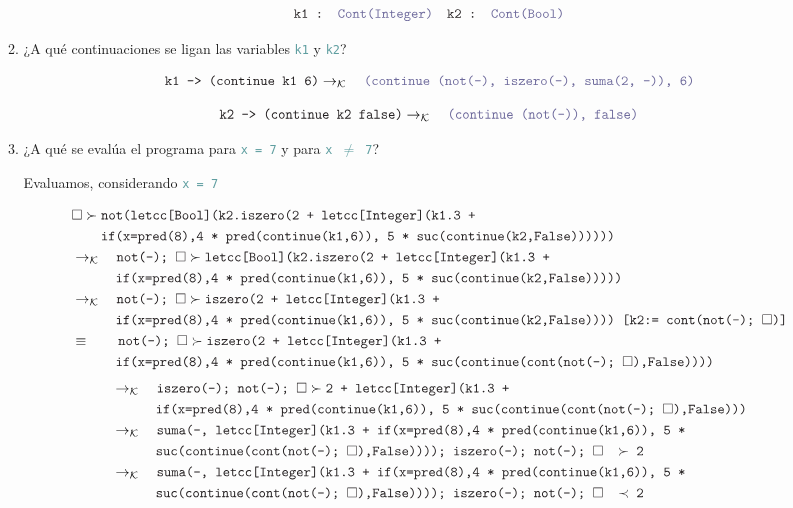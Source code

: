 \documentclass{article}
\newcommand{\tx}[1]{\textcolor{Black} {\texttt{#1}}}
\newcommand{\tp}[1]{\textcolor{CadetBlue} {\texttt{#1}}}
\newcommand{\es}{$\square$}
\newcommand{\pop}[2]{ \tx{#1} \succ \tx{#2}}
\newcommand{\kr}{\rightarrow_{\mathcal{K}} \quad}
\begin{document}
\begin{enumerate}
\begin{enumerate}
            \[
                \tx{k1 : } \tp{Cont(Integer)} \quad \tx{k2 : } \tp{Cont(Bool)}
            \]

            \item ¿A qué continuaciones se ligan las variables \tp{k1} y \tp{k2}?

			\[
			\tx{k1 --> (continue k1 6)} 
			\kr \tp{(continue (not(-), iszero(-), suma(2, -)), 6)}
			\]
			
			\[
			\tx{k2 --> (continue k2 false)} 
			\kr \tp{(continue (not(-)), false)}
			\]
			
            \item ¿A qué se evalúa el programa para \tp{x = 7} y para \tp{x $\neq$ 7}?
     		
     		Evaluamos, considerando \tp{x = 7}

			\begin{align*}
			&\pop{\es}{not(letcc[Bool](k2.iszero(2 + letcc[Integer](k1.3 +} \\
			&\tx{\quad \quad  if(x=pred(8),4 * pred(continue(k1,6)), 5 * suc(continue(k2,False))))))}\\
			&\kr \pop{not(-); \es}{letcc[Bool](k2.iszero(2 + letcc[Integer](k1.3 +} \\
			&\tx{\quad \quad \quad if(x=pred(8),4 * pred(continue(k1,6)), 5 * suc(continue(k2,False)))))}\\
			&\kr \pop{not(-); \es}{iszero(2 + letcc[Integer](k1.3 +} \\
			&\tx{\quad \quad \quad if(x=pred(8),4 * pred(continue(k1,6)), 5 * suc(continue(k2,False)))) [k2:= cont(not(-); \es)]}\\
			&\equiv \quad \quad \pop{not(-); \es}{iszero(2 + letcc[Integer](k1.3 +} \\
			&\tx{\quad \quad \quad if(x=pred(8),4 * pred(continue(k1,6)), 5 * suc(continue(cont(not(-); \es),False))))}\\		
			\end{align*}
			\begin{align*}			
			&\kr \pop{iszero(-); not(-); \es}{2 + letcc[Integer](k1.3 +} \\
			&\tx{\quad \quad \quad if(x=pred(8),4 * pred(continue(k1,6)), 5 * suc(continue(cont(not(-); \es),False)))}\\
			&\kr \tx{suma(-, letcc[Integer](k1.3 + if(x=pred(8),4 * pred(continue(k1,6)), 5 *}\\ &\tx{\quad \quad \quad suc(continue(cont(not(-); \es),False)))); iszero(-); not(-); \es $\quad \succ$ 2}\\
			&\kr \tx{suma(-, letcc[Integer](k1.3 + if(x=pred(8),4 * pred(continue(k1,6)), 5 *}\\ &\tx{\quad \quad \quad suc(continue(cont(not(-); \es),False)))); iszero(-); not(-); \es $\quad \prec$ 2}\\

\end{align*}
\end{enumerate}
\end{enumerate}
\end{document}
